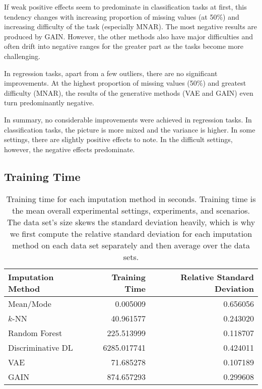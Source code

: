 If weak positive effects seem to predominate in classification tasks at first, this tendency changes with increasing proportion of missing values (at 50\%) and increasing difficulty of the task (especially MNAR). The most negative results are produced by GAIN. However, the other methods also have major difficulties and often drift into negative ranges for the greater part as the tasks become more challenging.

In regression tasks, apart from a few outliers, there are no significant improvements. At the highest proportion of missing values (50\%) and greatest difficulty (MNAR), the results of the generative methods (VAE and GAIN) even turn predominantly negative.

In summary, no considerable improvements were achieved in regression tasks. In classification tasks, the picture is more mixed and the variance is higher. In some settings, there are slightly positive effects to note. In the difficult settings, however, the negative effects predominate.


\subsection{Training Time}

\begin{table}
	\centering
	\label{tab:time}
	\begin{tabular}{lrr}
		\toprule
		Imputation Method &  Training Time &  Relative Standard Deviation \\
		\midrule
		Mean/Mode &       0.005009 &                     0.656056 \\
		$k$-NN &      40.961577 &                     0.243020 \\
		Random Forest &     225.513999 &                     0.118707 \\
		Discriminative DL &    6285.017741 &                     0.424011 \\
		VAE &      71.685278 &                     0.107189 \\
		GAIN &     874.657293 &                     0.299608 \\
		\bottomrule
	\end{tabular}
	\caption{Training time for each imputation method in seconds. Training time is the mean overall experimental settings, experiments, and scenarios. The data set's size skews the standard deviation heavily, which is why we first compute the relative standard deviation for each imputation method on each data set separately and then average over the data sets.}
\end{table}
